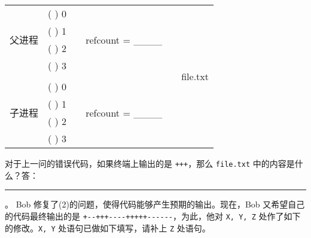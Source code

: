 \begin{problems}
\begin{table}[H]
\begin{tabular}{cccccc}
                \multicolumn{1}{|c|}{\multirow{4}{*}{父进程}} & \multicolumn{1}{c|}{(     ) 0} & \multicolumn{1}{c|}{} & \multicolumn{1}{c|}{\multirow{4}{*}{refcount = \_\_\_\_}} & \multicolumn{1}{c|}{} & \multicolumn{1}{c|}{\multirow{9}{*}{file.txt}} \\ \cline{2-2}
                \multicolumn{1}{|c|}{} & \multicolumn{1}{c|}{(     ) 1} & \multicolumn{1}{c|}{} & \multicolumn{1}{c|}{} & \multicolumn{1}{c|}{} & \multicolumn{1}{c|}{} \\ \cline{2-2}
                \multicolumn{1}{|c|}{} & \multicolumn{1}{c|}{(     ) 2} & \multicolumn{1}{c|}{} & \multicolumn{1}{c|}{} & \multicolumn{1}{c|}{} & \multicolumn{1}{c|}{} \\ \cline{2-2}
                \multicolumn{1}{|c|}{} & \multicolumn{1}{c|}{(     ) 3} & \multicolumn{1}{c|}{} & \multicolumn{1}{c|}{} & \multicolumn{1}{c|}{} & \multicolumn{1}{c|}{} \\ \cline{1-2} \cline{4-4}
                &  &  &  & \multicolumn{1}{c|}{} & \multicolumn{1}{c|}{} \\ \cline{1-2} \cline{4-4}
                \multicolumn{1}{|c|}{\multirow{4}{*}{子进程}} & \multicolumn{1}{c|}{(     ) 0} & \multicolumn{1}{c|}{} & \multicolumn{1}{c|}{\multirow{4}{*}{refcount = \_\_\_\_}} & \multicolumn{1}{c|}{} & \multicolumn{1}{c|}{} \\ \cline{2-2}
                \multicolumn{1}{|c|}{} & \multicolumn{1}{c|}{(     ) 1} & \multicolumn{1}{c|}{} & \multicolumn{1}{c|}{} & \multicolumn{1}{c|}{} & \multicolumn{1}{c|}{} \\ \cline{2-2}
                \multicolumn{1}{|c|}{} & \multicolumn{1}{c|}{(     ) 2} & \multicolumn{1}{c|}{} & \multicolumn{1}{c|}{} & \multicolumn{1}{c|}{} & \multicolumn{1}{c|}{} \\ \cline{2-2}
                \multicolumn{1}{|c|}{} & \multicolumn{1}{c|}{(     ) 3} & \multicolumn{1}{c|}{} & \multicolumn{1}{c|}{} & \multicolumn{1}{c|}{} & \multicolumn{1}{c|}{} \\ \cline{1-2} \cline{4-4} \cline{6-6} 
            \end{tabular}
        \end{table}
        \qn 对于上一问的错误代码，如果终端上输出的是 \verb|+++|，那么 \verb|file.txt| 中的内容是什么？答：\rule{6cm}{0.25mm}。
        \qn Bob 修复了(2)的问题，使得代码能够产生预期的输出。现在，Bob 又希望自己的代码最终输出的是 \verb|+--+++----+++++------|，为此，他对 \verb|X, Y, Z| 处作了如下的修改。\verb|X, Y| 处语句已做如下填写，请补上 \verb|Z| 处语句。
        \begin{compactitem}

\end{compactitem}
\end{problems}
